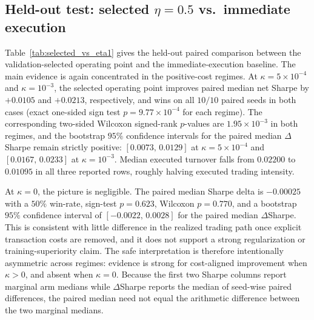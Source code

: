 \documentclass[10pt,twocolumn]{article}
\newcommand{\kappaTC}{\kappa}
\begin{document}
\subsection{Held-out test: selected \texorpdfstring{$\eta=0.5$}{eta=0.5} vs.\ immediate execution}
Table~\ref{tab:selected_vs_eta1} gives the held-out paired comparison between the validation-selected operating point and the immediate-execution baseline. The main evidence is again concentrated in the positive-cost regimes. At $\kappa=5\times10^{-4}$ and $\kappa=10^{-3}$, the selected operating point improves paired median net Sharpe by $+0.0105$ and $+0.0213$, respectively, and wins on all $10/10$ paired seeds in both cases (exact one-sided sign test $p=9.77\times10^{-4}$ for each regime). The corresponding two-sided Wilcoxon signed-rank $p$-values are $1.95\times10^{-3}$ in both regimes, and the bootstrap $95\%$ confidence intervals for the paired median $\Delta$Sharpe remain strictly positive: $[0.0073,\,0.0129]$ at $\kappa=5\times10^{-4}$ and $[0.0167,\,0.0233]$ at $\kappa=10^{-3}$. Median executed turnover falls from $0.02200$ to $0.01095$ in all three reported rows, roughly halving executed trading intensity.

At $\kappa=0$, the picture is negligible. The paired median Sharpe delta is $-0.00025$ with a $50\%$ win-rate, sign-test $p=0.623$, Wilcoxon $p=0.770$, and a bootstrap $95\%$ confidence interval of $[-0.0022,\,0.0028]$ for the paired median $\Delta$Sharpe. This is consistent with little difference in the realized trading path once explicit transaction costs are removed, and it does not support a strong regularization or training-superiority claim. The safe interpretation is therefore intentionally asymmetric across regimes: evidence is strong for cost-aligned improvement when $\kappaTC>0$, and absent when $\kappaTC=0$. Because the first two Sharpe columns report marginal arm medians while $\Delta$Sharpe reports the median of seed-wise paired differences, the paired median need not equal the arithmetic difference between the two marginal medians.
\end{document}
